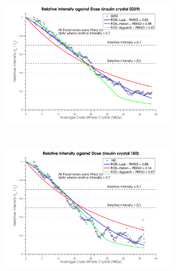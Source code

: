 \begin{figure}[H]
    \centering
    \begin{subfigure}[b]{1\textwidth}
        \centering
        \includegraphics[width=\textwidth]{figures/dwd/relintplot0259.pdf}
        \caption{}
        \label{Relative Intensity Plots - 0259}
    \end{subfigure}
			\\
    \begin{subfigure}[b]{1\textwidth}
        \centering
        \includegraphics[width=\textwidth]{figures/dwd/relintplot180.pdf}
        \caption{}
        \label{Relative Intensity Plots - 180}
    \end{subfigure}
\end{figure}
\clearpage
